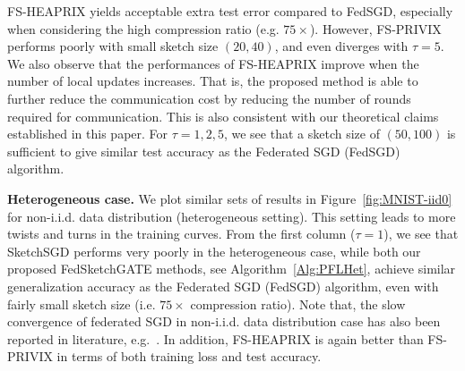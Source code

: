 \documentclass[twoside]{article}
\begin{document}
FS-HEAPRIX yields acceptable extra test error compared to FedSGD, especially when considering the high compression ratio (e.g. $75\times$). 
However, FS-PRIVIX performs poorly with small sketch size $(20,40)$, and even diverges with $\tau=5$. 
We also observe that the performances of FS-HEAPRIX improve when the number of local updates increases. That is, the proposed method is able to further reduce the communication cost by reducing the number of rounds required for communication. This is also consistent with our theoretical claims established in this paper. For $\tau=1,2,5$, we see that a sketch size of $(50,100)$ is sufficient to give similar test accuracy as the Federated SGD (FedSGD) algorithm.


\textbf{Heterogeneous case.} We plot similar sets of results in Figure~\ref{fig:MNIST-iid0} for non-i.i.d. data distribution (heterogeneous setting). This setting leads to more twists and turns in the training curves. 
From the first column ($\tau=1$), we see that SketchSGD performs very poorly in the heterogeneous case, while both our proposed FedSketchGATE methods, see Algorithm~\ref{Alg:PFLHet}, achieve similar generalization accuracy as the Federated SGD (FedSGD) algorithm, even with fairly small sketch size (i.e. $75\times$ compression ratio). Note that, the slow convergence of federated SGD in non-i.i.d. data distribution case has also been reported in literature, e.g.~\cite{mcmahan2016communication,chen2020toward}. In addition, FS-HEAPRIX is again better than FS-PRIVIX in terms of both training loss and test accuracy.
\end{document}
